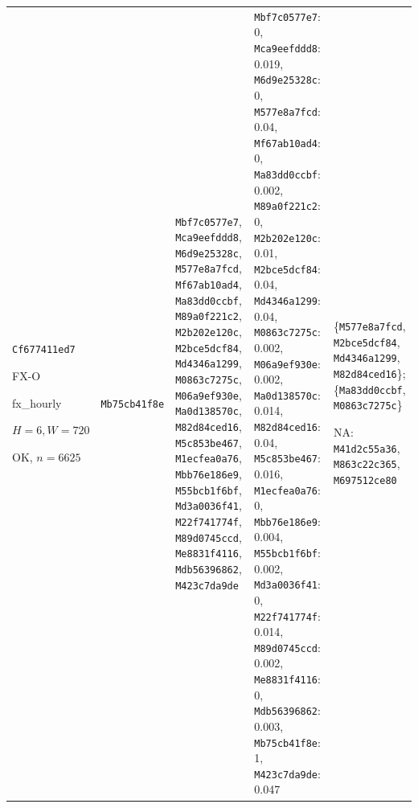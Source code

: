 \begin{longtable}{p{.15\linewidth}p{.17\linewidth}p{.17\linewidth}p{.25\linewidth}p{.14\linewidth}}
\texttt{Cf677411ed7}\par FX-O\par fx\_\allowbreak{}hourly\par $H=6,W=720$\par OK, $n=6625$ & \texttt{Mb75cb41f8e} & \texttt{Mbf7c0577e7}, \texttt{Mca9eefddd8}, \texttt{M6d9e25328c}, \texttt{M577e8a7fcd}, \texttt{Mf67ab10ad4}, \texttt{Ma83dd0ccbf}, \texttt{M89a0f221c2}, \texttt{M2b202e120c}, \texttt{M2bce5dcf84}, \texttt{Md4346a1299}, \texttt{M0863c7275c}, \texttt{M06a9ef930e}, \texttt{Ma0d138570c}, \texttt{M82d84ced16}, \texttt{M5c853be467}, \texttt{M1ecfea0a76}, \texttt{Mbb76e186e9}, \texttt{M55bcb1f6bf}, \texttt{Md3a0036f41}, \texttt{M22f741774f}, \texttt{M89d0745ccd}, \texttt{Me8831f4116}, \texttt{Mdb56396862}, \texttt{M423c7da9de} & \texttt{Mbf7c0577e7}: 0, \texttt{Mca9eefddd8}: 0.019, \texttt{M6d9e25328c}: 0, \texttt{M577e8a7fcd}: 0.04, \texttt{Mf67ab10ad4}: 0, \texttt{Ma83dd0ccbf}: 0.002, \texttt{M89a0f221c2}: 0, \texttt{M2b202e120c}: 0.01, \texttt{M2bce5dcf84}: 0.04, \texttt{Md4346a1299}: 0.04, \texttt{M0863c7275c}: 0.002, \texttt{M06a9ef930e}: 0.002, \texttt{Ma0d138570c}: 0.014, \texttt{M82d84ced16}: 0.04, \texttt{M5c853be467}: 0.016, \texttt{M1ecfea0a76}: 0, \texttt{Mbb76e186e9}: 0.004, \texttt{M55bcb1f6bf}: 0.002, \texttt{Md3a0036f41}: 0, \texttt{M22f741774f}: 0.014, \texttt{M89d0745ccd}: 0.002, \texttt{Me8831f4116}: 0, \texttt{Mdb56396862}: 0.003, \texttt{Mb75cb41f8e}: 1, \texttt{M423c7da9de}: 0.047 & \{\texttt{M577e8a7fcd}, \texttt{M2bce5dcf84}, \texttt{Md4346a1299}, \texttt{M82d84ced16}\}; \{\texttt{Ma83dd0ccbf}, \texttt{M0863c7275c}\}\par NA: \texttt{M41d2c55a36}, \texttt{M863c22c365}, \texttt{M697512ce80} \\

\end{longtable}
